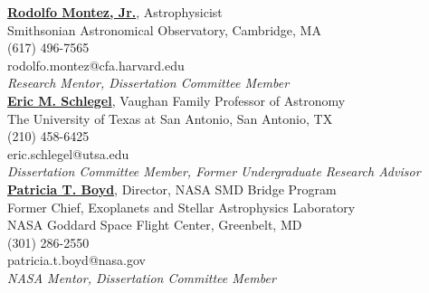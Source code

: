 \documentclass[letter,11pt]{article}
\begin{document}
\noindent
\href{http://www.rudyphd.com/}{\textbf{Rodolfo Montez, Jr.}}, Astrophysicist \\
Smithsonian Astronomical Observatory, Cambridge, MA \\
(617) 496-7565 \\
rodolfo.montez@cfa.harvard.edu \\
\textit{Research Mentor, Dissertation Committee Member} \\

\noindent
\href{https://www.utsa.edu/physics/faculty/EricSchlegel.html}{\textbf{Eric M. Schlegel}}, Vaughan Family Professor of Astronomy \\
The University of Texas at San Antonio, San Antonio, TX \\
(210) 458-6425 \\
eric.schlegel@utsa.edu \\
\textit{Dissertation Committee Member, Former Undergraduate Research Advisor} \\

\noindent
\href{https://science.gsfc.nasa.gov/sed/bio/patricia.t.boyd}{\textbf{Patricia T. Boyd}}, Director, NASA SMD Bridge Program \\
Former Chief, Exoplanets and Stellar Astrophysics Laboratory \\
NASA Goddard Space Flight Center, Greenbelt, MD \\
(301) 286-2550 \\
patricia.t.boyd@nasa.gov \\
\textit{ NASA Mentor, Dissertation Committee Member} \\
\end{document}
